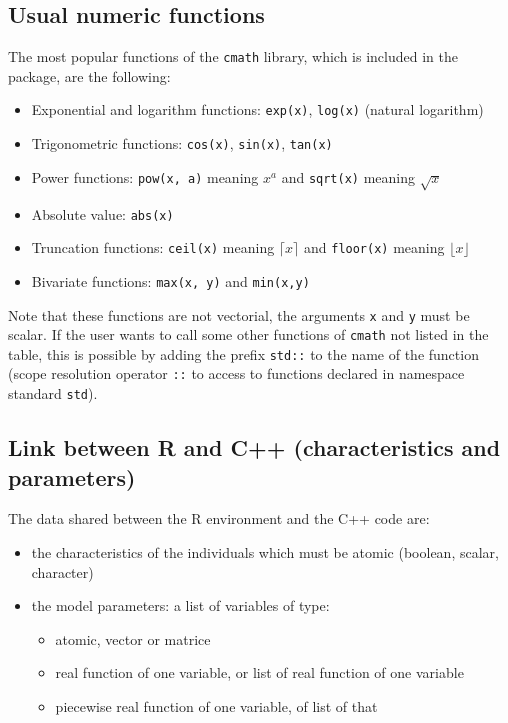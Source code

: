 \hypertarget{usual-numeric-functions}{%
\subsection{Usual numeric functions}\label{usual-numeric-functions}}

The most popular functions of the \texttt{cmath} library, which is included in the package, are the following:

\begin{itemize}
\tightlist
\item
  Exponential and logarithm functions: \texttt{exp(x)}, \texttt{log(x)} (natural logarithm)
\item
  Trigonometric functions: \texttt{cos(x)}, \texttt{sin(x)}, \texttt{tan(x)}
\item
  Power functions: \texttt{pow(x,\ a)} meaning \(x^a\) and \texttt{sqrt(x)} meaning \(\sqrt{x}\)
\item
  Absolute value: \texttt{abs(x)}
\item
  Truncation functions: \texttt{ceil(x)} meaning \(\lceil x \rceil\) and \texttt{floor(x)} meaning \(\lfloor x \rfloor\)
\item
  Bivariate functions: \texttt{max(x,\ y)} and \texttt{min(x,y)}
\end{itemize}

Note that these functions are not vectorial, the arguments \texttt{x} and \texttt{y} must be scalar. If the user wants to call some other functions of \texttt{cmath} not listed in the table, this is possible by adding the prefix \texttt{std::} to the name of the function (scope resolution operator \texttt{::} to access to functions declared in namespace standard \texttt{std}).

\hypertarget{link-between-r-and-c-characteristics-and-parameters}{%
\subsection{Link between R and C++ (characteristics and parameters)}\label{link-between-r-and-c-characteristics-and-parameters}}

The data shared between the R environment and the C++ code are:

\begin{itemize}
\tightlist
\item
  the characteristics of the individuals which must be atomic (boolean, scalar, character)
\item
  the model parameters: a list of variables of type:

  \begin{itemize}
  \tightlist
  \item
    atomic, vector or matrice
  \item
    real function of one variable, or list of real function of one variable
  \item
    piecewise real function of one variable, of list of that
  \end{itemize}
\end{itemize}

